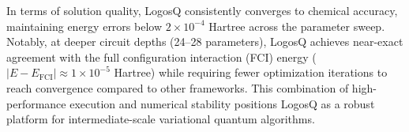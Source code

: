 In terms of solution quality, LogosQ consistently converges to chemical accuracy, maintaining energy errors below $2 \times 10^{-4}$ Hartree across the parameter sweep. Notably, at deeper circuit depths (24--28 parameters), LogosQ achieves near-exact agreement with the full configuration interaction (FCI) energy ($|E - E_{\text{FCI}}| \approx 1 \times 10^{-5}$ Hartree) while requiring fewer optimization iterations to reach convergence compared to other frameworks. This combination of high-performance execution and numerical stability positions LogosQ as a robust platform for intermediate-scale variational quantum algorithms.
